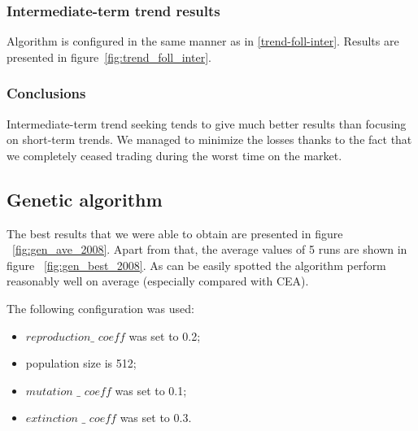 \subsubsection{Intermediate-term trend results}

Algorithm is configured in the same manner as in \ref{trend-foll-inter}.
Results are presented in figure~\ref{fig:trend_foll_inter}.


\subsubsection{Conclusions}

Intermediate-term trend seeking tends to give much better results than focusing on short-term trends.
We managed to minimize the losses thanks to the fact that we completely ceased trading during the worst time on the market.

\subsection{Genetic algorithm}

The best results that we were able to obtain are presented in figure ~\ref{fig:gen_ave_2008}.
Apart from that, the average values of 5 runs are shown in figure ~\ref{fig:gen_best_2008}.
As can be easily spotted the algorithm perform reasonably well on average (especially compared with CEA).

The following configuration was used:
\begin{itemize}
  \item $reproduction\_$ $coeff$ was set to 0.2;
  \item population size is 512;
  \item $mutation$ $\_$ $coeff$ was set to 0.1;
  \item $extinction$ $\_$ $coeff$ was set to 0.3.
\end{itemize}

